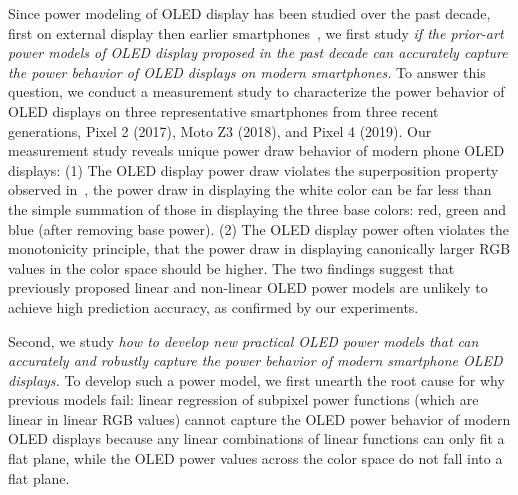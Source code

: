 Since power modeling of OLED display has been studied
over the past decade, first on external display then
earlier smartphones~\cite{dong2009current,kim2013runtime,park2015accurate},
we first study {\em if the prior-art power models of OLED display proposed
  in the past decade can accurately capture the power behavior of OLED
  displays on modern smartphones.}  To answer this question, we
conduct a measurement study to characterize the power behavior of OLED
displays on three representative smartphones from 
three recent generations, Pixel 2 (2017), Moto Z3 (2018), and Pixel 4 (2019).
%
Our measurement study reveals
unique power draw behavior of modern phone OLED displays: (1) The OLED
display power draw violates the superposition property observed
in~\cite{dong2009current}, \eg the power draw in displaying
the white color can be far less than the simple summation of those in
displaying the three base colors: red, green and blue (after removing
base power).  (2) The OLED
display power often violates the  monotonicity principle, that
the power draw in displaying canonically larger RGB values in the color
space should be higher.
The two findings suggest that previously proposed
linear and non-linear OLED power models are unlikely to achieve high
prediction accuracy, as confirmed by our experiments.

Second, we study {\em how to develop new practical OLED power models that
  can accurately and robustly capture the power behavior of modern smartphone OLED
  displays.}  To develop such a power model,
we first unearth the root cause for why previous models fail:
linear regression of subpixel power functions (which are linear in linear RGB
values)
cannot capture the OLED power behavior of modern OLED displays
because any linear combinations of linear functions 
can only fit a flat plane, while the OLED power
values across the color space do not fall into a flat plane.

